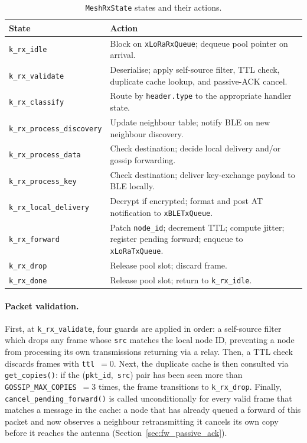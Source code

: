 \documentclass[english,bachelor]{tfgitic}[2026/01/22]
\begin{document}
\begin{table}[htbp]
    \centering
    \caption{\texttt{MeshRxState} states and their actions.}
    \label{tab:fw_states}
    \begin{tabular}{lp{9.5cm}}
        \toprule
        \textbf{State} & \textbf{Action} \\
        \midrule
        \texttt{k\_rx\_idle}              & Block on \texttt{xLoRaRxQueue}; dequeue pool pointer on arrival. \\
        \texttt{k\_rx\_validate}          & Deserialise; apply self-source filter, TTL check, duplicate cache lookup, and passive-ACK cancel. \\
        \texttt{k\_rx\_classify}          & Route by \texttt{header.type} to the appropriate handler state. \\
        \texttt{k\_rx\_process\_discovery}& Update neighbour table; notify BLE on new neighbour discovery. \\
        \texttt{k\_rx\_process\_data}     & Check destination; decide local delivery and/or gossip forwarding. \\
        \texttt{k\_rx\_process\_key}      & Check destination; deliver key-exchange payload to BLE locally. \\
        \texttt{k\_rx\_local\_delivery}   & Decrypt if encrypted; format and post AT notification to \texttt{xBLETxQueue}. \\
        \texttt{k\_rx\_forward}           & Patch \texttt{node\_id}; decrement TTL; compute jitter; register pending forward; enqueue to \texttt{xLoRaTxQueue}. \\
        \texttt{k\_rx\_drop}              & Release pool slot; discard frame. \\
        \texttt{k\_rx\_done}              & Release pool slot; return to \texttt{k\_rx\_idle}. \\
        \bottomrule
    \end{tabular}
\end{table}


\paragraph{Packet validation.}
First, at \texttt{k\_rx\_validate}, four guards are applied in order: a self-source filter
which drops any frame whose \texttt{src} matches the local node ID, preventing a node
from processing its own transmissions returning via a relay. Then, a TTL check discards
frames with \texttt{ttl}~$= 0$. Next, the duplicate cache is then consulted via
\texttt{get\_copies()}: if the (\texttt{pkt\_id},~\texttt{src}) pair has been seen
more than \texttt{GOSSIP\_MAX\_COPIES}~$= 3$ times, the frame transitions to
\texttt{k\_rx\_drop}. Finally, \texttt{cancel\_pending\_forward()} is called
unconditionally for every valid frame that matches a message in the cache: a node
that has already queued a forward of this packet and now observes a neighbour
retransmitting it cancels its own copy before it reaches the antenna
(Section~\ref{sec:fw_passive_ack}).
\end{document}
